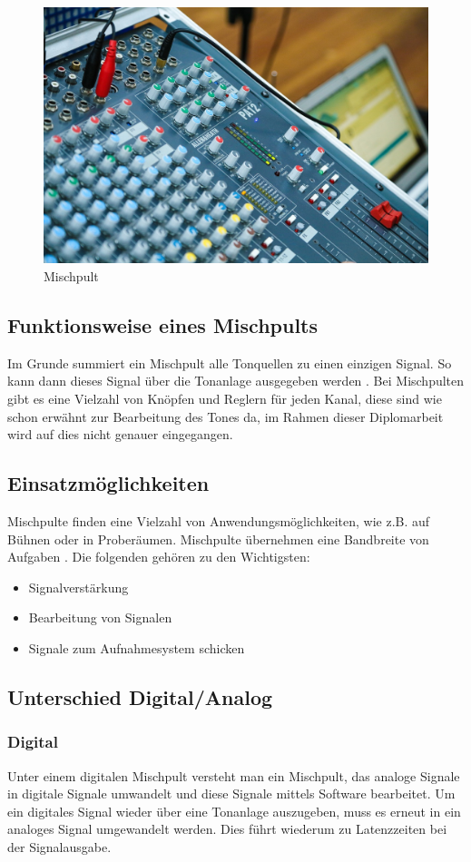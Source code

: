 \begin{figure}[H]
	\centering
	\includegraphics[width=0.6\linewidth]{images/mischpult.jpg}
	\caption[Mischpult]{Mischpult}
	\label{fig:Mischpult}
\end{figure}

\subsection{Funktionsweise eines Mischpults}
Im Grunde summiert ein Mischpult alle Tonquellen zu einen einzigen Signal. So kann dann dieses Signal über die Tonanlage ausgegeben werden \parencite{MischpultErklaerung}. Bei Mischpulten gibt es eine Vielzahl von Knöpfen und Reglern für jeden Kanal, diese sind wie schon erwähnt zur Bearbeitung des Tones da, im Rahmen dieser Diplomarbeit wird auf dies nicht genauer eingegangen. \\

\newpage
\subsection{Einsatzmöglichkeiten}
Mischpulte finden eine Vielzahl von Anwendungsmöglichkeiten, wie z.B. auf Bühnen oder in Proberäumen. Mischpulte übernehmen eine Bandbreite von Aufgaben \parencite{MischpultVerwendungszweck}. Die folgenden gehören zu den Wichtigsten:
\begin{itemize}
	\item Signalverstärkung
	\item Bearbeitung von Signalen
	\item Signale zum Aufnahmesystem schicken
\end{itemize}


\subsection{Unterschied Digital/Analog}
\subsubsection{Digital}
Unter einem digitalen Mischpult versteht man ein Mischpult, das analoge Signale in digitale Signale umwandelt und diese Signale mittels Software bearbeitet. Um ein digitales Signal wieder über eine Tonanlage auszugeben, muss es erneut in ein analoges Signal umgewandelt werden. Dies führt wiederum zu Latenzzeiten bei der Signalausgabe.
